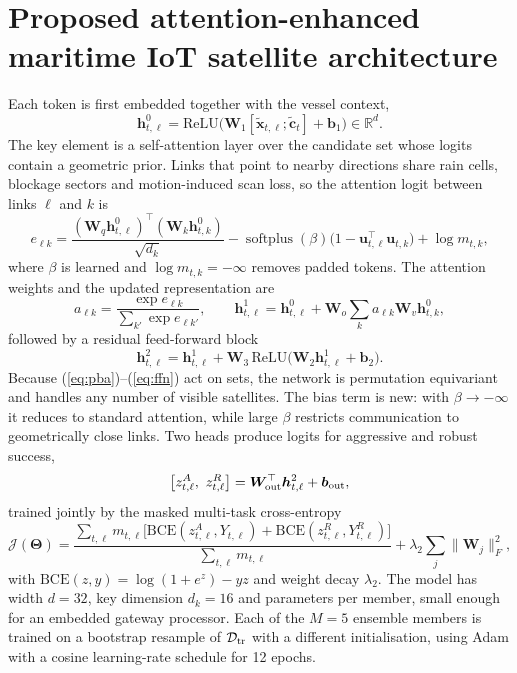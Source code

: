 \section{Proposed attention-enhanced maritime IoT satellite architecture}\label{sec:arch}
Each token is first embedded together with the vessel context,
\begin{equation}\label{eq:embed}
\bm h^{0}_{t,\ell}=\mathrm{ReLU}\big(\bm W_1[\tilde{\bm x}_{t,\ell};\tilde{\bm c}_t]+\bm b_1\big)\in\mathbb R^{d}.
\end{equation}
The key element is a self-attention layer over the candidate set whose logits contain a geometric prior. Links that point to nearby directions share rain cells, blockage sectors and motion-induced scan loss, so the attention logit between links $\ell$ and $k$ is
\begin{equation}\label{eq:pba}
e_{\ell k}=\frac{(\bm W_q\bm h^0_{t,\ell})^{\top}(\bm W_k\bm h^0_{t,k})}{\sqrt{d_k}}-\operatorname{softplus}(\beta)\big(1-\bm u_{t,\ell}^{\top}\bm u_{t,k}\big)+\log m_{t,k},
\end{equation}
where $\beta$ is learned and $\log m_{t,k}=-\infty$ removes padded tokens. The attention weights and the updated representation are
\begin{equation}\label{eq:softmax}
a_{\ell k}=\frac{\exp e_{\ell k}}{\sum_{k'}\exp e_{\ell k'}},\qquad
\bm h^{1}_{t,\ell}=\bm h^{0}_{t,\ell}+\bm W_o\sum_k a_{\ell k}\bm W_v\bm h^{0}_{t,k},
\end{equation}
followed by a residual feed-forward block
\begin{equation}\label{eq:ffn}
\bm h^{2}_{t,\ell}=\bm h^{1}_{t,\ell}+\bm W_3\,\mathrm{ReLU}\big(\bm W_2\bm h^{1}_{t,\ell}+\bm b_2\big).
\end{equation}
Because (\ref{eq:pba})--(\ref{eq:ffn}) act on sets, the network is permutation equivariant and handles any number of visible satellites. The bias term is new: with $\beta\to-\infty$ it reduces to standard attention, while large $\beta$ restricts communication to geometrically close links. Two heads produce logits for aggressive and robust success,
\begin{equation}\label{eq:heads}
\big[z^{A}_{t,\ell},\ z^{R}_{t,\ell}\big]=\bm W_{\rm out}^{\top}\bm h^{2}_{t,\ell}+\bm b_{\rm out},
\end{equation}
trained jointly by the masked multi-task cross-entropy
\begin{equation}\label{eq:loss}
\mathcal J(\bm\Theta)=\frac{\sum_{t,\ell}m_{t,\ell}\big[\mathrm{BCE}(z^A_{t,\ell},Y_{t,\ell})+\mathrm{BCE}(z^R_{t,\ell},Y^R_{t,\ell})\big]}{\sum_{t,\ell}m_{t,\ell}}+\lambda_2\sum_j\|\bm W_j\|_F^2,
\end{equation}
with $\mathrm{BCE}(z,y)=\log(1+e^{z})-yz$ and weight decay $\lambda_2$. The model has width $d=32$, key dimension $d_k=16$ and \RParams{} parameters per member, small enough for an embedded gateway processor. Each of the $M=5$ ensemble members is trained on a bootstrap resample of $\mathcal D_{\rm tr}$ with a different initialisation, using Adam with a cosine learning-rate schedule for 12 epochs.

